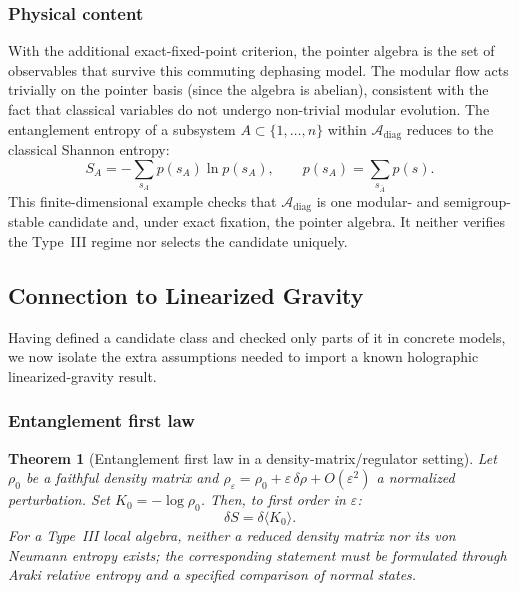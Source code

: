 \documentclass[12pt,a4paper,openany]{book}
\newtheorem{theorem}{Theorem}[chapter]
\begin{document}
\subsubsection{Physical content}

With the additional exact-fixed-point criterion, the pointer algebra is the set of observables that survive this commuting dephasing model.
The modular flow acts trivially on the pointer basis (since the algebra is abelian), consistent with the fact that classical variables do not undergo non-trivial modular evolution.
The entanglement entropy of a subsystem $A \subset \{1, \ldots, n\}$ within $\mathcal{A}_{\mathrm{diag}}$ reduces to the classical Shannon entropy:
\begin{equation}
S_A = -\sum_{s_A} p(s_A) \ln p(s_A), \qquad p(s_A) = \sum_{s_{\bar{A}}} p(s).
\end{equation}
This finite-dimensional example checks that $\mathcal A_{\mathrm{diag}}$ is one modular- and semigroup-stable candidate and, under exact fixation, the pointer algebra.  It neither verifies the Type~III regime nor selects the candidate uniquely.


\subsection{Connection to Linearized Gravity}
\label{H-D-sec:linearized}

Having defined a candidate class and checked only parts of it in concrete models, we now isolate the extra assumptions needed to import a known holographic linearized-gravity result.

\subsubsection{Entanglement first law}

\begin{theorem}[Entanglement first law in a density-matrix/regulator setting]
\label{H-D-thm:first-law}
Let $\rho_0$ be a faithful density matrix and $\rho_\varepsilon=\rho_0+\varepsilon\,\delta\rho+O(\varepsilon^2)$ a normalized perturbation.  Set $K_0=-\log\rho_0$.
Then, to first order in $\varepsilon$:
\begin{equation}
\delta S = \delta \langle K_0 \rangle.
\end{equation}
For a Type~III local algebra, neither a reduced density matrix nor its von Neumann entropy exists; the corresponding statement must be formulated through Araki relative entropy and a specified comparison of normal states.
\end{theorem}
\end{document}
